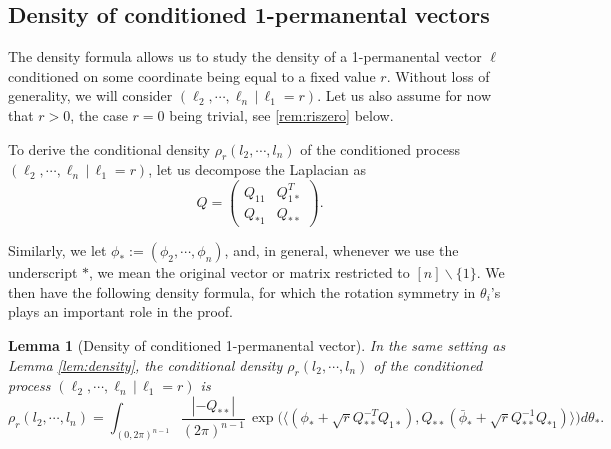 \documentclass[a4paper, 11pt]{article}
\newtheorem{lem}[thm]{Lemma}
\begin{document}
\subsection{Density of conditioned 1-permanental vectors}

The density formula allows us to study the density of a 1-permanental vector $\ell$ conditioned on some coordinate being equal to a fixed value $r$. Without loss of generality, we will consider $(\ell_2, \cdots, \ell_n\, |\, \ell_1=r)$. Let us also assume for now that $r>0$, the case $r=0$ being trivial, see \cref{rem:riszero} below.

To derive the conditional density $\rho_r(l_2, \cdots, l_n)$ of the conditioned process $(\ell_2, \cdots, \ell_n\, |\, \ell_1=r)$, let us decompose the Laplacian as
\begin{equation}
Q=\begin{pmatrix}Q_{11} & Q_{1*}^T\\
Q_{*1} & Q_{**}
\end{pmatrix}.
\label{eqn:decomp}
\end{equation}

Similarly, we
let $\phi_* :=(\phi_2,\cdots, \phi_n)$,
and, in general, whenever we use the underscript $*$, we mean the original vector or matrix restricted to $[n]\backslash\{1\}$. We then have the following density formula, for which the rotation symmetry in $\theta_i$'s plays an important role in the proof.

\vspace{.3em} \begin{lem}[Density of conditioned 1-permanental vector]
\label{lem:conditioned}
In the same setting as Lemma \ref{lem:density}, the conditional density $\rho_r(l_2, \cdots, l_n)$ of the conditioned process $(\ell_2, \cdots, \ell_n\, |\, \ell_1=r)$ is
\[\rho_r(l_2,\cdots, l_n) =  \int_{(0,2\pi)^{n-1}}\frac{|-Q_{**}|}{(2\pi)^{n-1}}\,
\exp\Big(\langle (\phi_*+ \sqrt{r}Q_{**}^{-T}Q_{1*}), Q_{**}(\bar{\phi}_*+ \sqrt{r}Q_{**}^{-1}Q_{*1})\rangle\Big)d\theta_*.\]
\end{lem}
\end{document}
